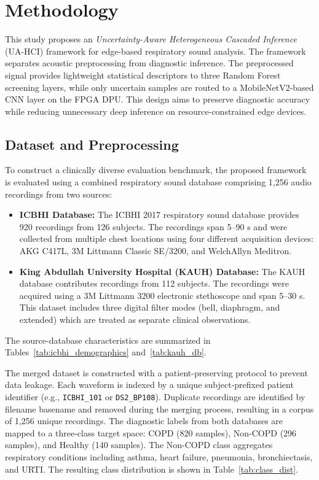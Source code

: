 \section{Methodology}
\label{sec:methodology}

This study proposes an \textit{Uncertainty-Aware Heterogeneous Cascaded Inference} (UA-HCI) framework for edge-based respiratory sound analysis. The framework separates acoustic preprocessing from diagnostic inference. The preprocessed signal provides lightweight statistical descriptors to three Random Forest screening layers, while only uncertain samples are routed to a MobileNetV2-based CNN layer on the FPGA DPU. This design aims to preserve diagnostic accuracy while reducing unnecessary deep inference on resource-constrained edge devices.

\subsection{Dataset and Preprocessing}
To construct a clinically diverse evaluation benchmark, the proposed framework is evaluated using a combined respiratory sound database comprising 1,256 audio recordings from two sources:

\begin{itemize}
    \item \textbf{ICBHI Database:} The ICBHI 2017 respiratory sound database \cite{b16} provides 920 recordings from 126 subjects. The recordings span 5--90 s and were collected from multiple chest locations using four different acquisition devices: AKG C417L, 3M Littmann Classic SE/3200, and WelchAllyn Meditron.
    \item \textbf{King Abdullah University Hospital (KAUH) Database:} The KAUH database \cite{kauh_db} contributes recordings from 112 subjects. The recordings were acquired using a 3M Littmann 3200 electronic stethoscope and span 5--30 s. This dataset includes three digital filter modes (bell, diaphragm, and extended) which are treated as separate clinical observations.
\end{itemize}
The source-database characteristics are summarized in Tables~\ref{tab:icbhi_demographics} and~\ref{tab:kauh_db}.




The merged dataset is constructed with a patient-preserving protocol to prevent data leakage. Each waveform is indexed by a unique subject-prefixed patient identifier (e.g., \texttt{ICBHI\_101} or \texttt{DS2\_BP108}). Duplicate recordings are identified by filename basename and removed during the merging process, resulting in a corpus of 1,256 unique recordings. The diagnostic labels from both databases are mapped to a three-class target space: COPD (820 samples), Non-COPD (296 samples), and Healthy (140 samples). The Non-COPD class aggregates respiratory conditions including asthma, heart failure, pneumonia, bronchiectasis, and URTI. The resulting class distribution is shown in Table~\ref{tab:class_dist}.

